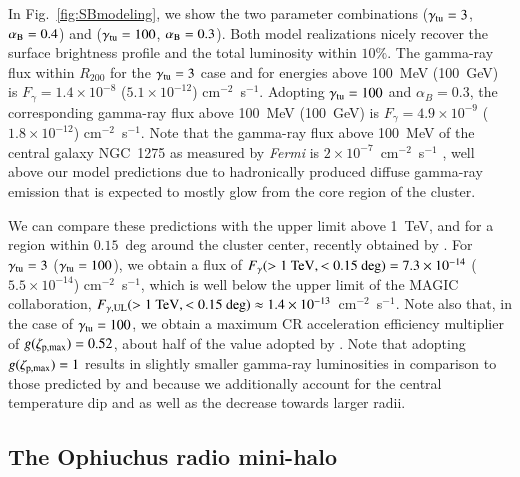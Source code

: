 \documentclass[useAMS,usenatbib]{mn2e}
\begin{document}
In Fig.~\ref{fig:SBmodeling}, we show the two parameter combinations
($\gamma_{{\mathrm{tu}}}=3$, $\alpha_{{\mathrm{B}}}=0.4$) and ($\gamma_{{\mathrm{tu}}}=100$,
$\alpha_{{\mathrm{B}}}=0.3$). Both model realizations nicely recover the surface
brightness profile and the total luminosity within $10\%$.  The gamma-ray flux
within $R_{200}$ for the $\gamma_{{\mathrm{tu}}}=3$ case and for energies above
100~MeV (100~GeV) is $F_{\gamma} = 1.4 \times 10^{-8}$ ($5.1 \times 10^{-12}$)
cm$^{-2}$~s$^{-1}$. Adopting $\gamma_{{\mathrm{tu}}}=100$ and $\alpha_B=0.3$, the
corresponding gamma-ray flux above 100~MeV (100~GeV) is $F_{\gamma} = 4.9 \times
10^{-9}$ ($1.8 \times 10^{-12}$) cm$^{-2}$~s$^{-1}$. Note that the gamma-ray
flux above 100~MeV of the central galaxy NGC~1275 as measured by \emph{Fermi} is
$2 \times 10^{-7}$~cm$^{-2}$~s$^{-1}$ \citep{2009arXiv0904.1904T}, well above
our model predictions due to hadronically produced diffuse gamma-ray emission
that is expected to mostly glow from the core region of the cluster.

We can compare these predictions with the upper limit above 1~TeV, and for a
region within $0.15$~deg around the cluster center, recently obtained by
\cite{2011arXiv1111.5544M}. For $\gamma_{{\mathrm{tu}}}=3$ ($\gamma_{{\mathrm{tu}}}=100$),
we obtain a flux of $F_{\gamma}(>1~{\mathrm{TeV}},<0.15~{\mathrm{deg}}) = 7.3 \times
10^{-14}$ ($5.5 \times 10^{-14}$) cm$^{-2}$~s$^{-1}$, which is well below the
upper limit of the MAGIC collaboration,
$F_{\gamma,{\mathrm{UL}}}(>1~{\mathrm{TeV}},<0.15~{\mathrm{deg}}) \approx 1.4 \times
10^{-13}$~cm$^{-2}$~s$^{-1}$. Note also that, in the case of $\gamma_{{\mathrm{tu}}}
= 100$, we obtain a maximum CR acceleration efficiency multiplier of
$g(\zeta_{{\mathrm{p,max}}})=0.52$, about half of the value adopted by
\cite{2010MNRAS.409..449P}. Note that adopting $g(\zeta_{{\mathrm{p,max}}})=1$
results in slightly smaller gamma-ray luminosities in comparison to those
predicted by \cite{2010MNRAS.409..449P} and \cite{2011arXiv1105.3240P} because
we additionally account for the central temperature dip and as well as the
decrease towards larger radii.


\subsection{The Ophiuchus radio mini-halo}
\end{document}
